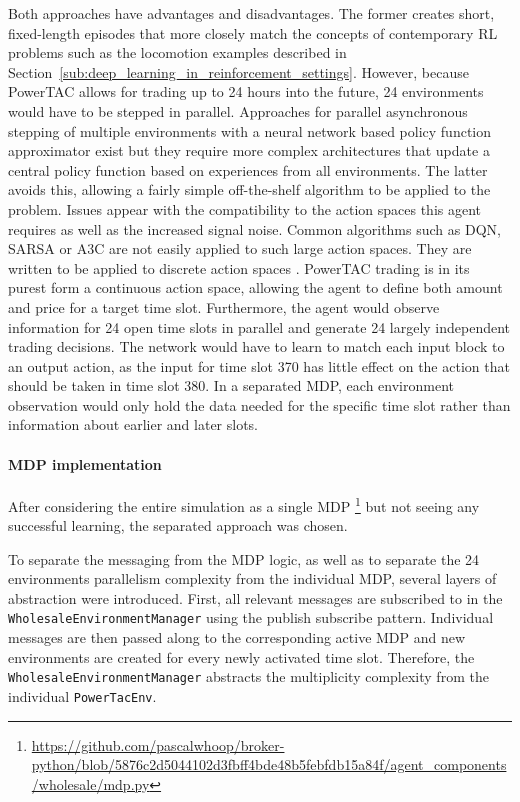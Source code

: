 Both approaches have advantages and disadvantages. The former creates short, fixed-length episodes that more closely
match the concepts of contemporary \ac{RL} problems such as the locomotion examples described in
Section~\ref{sub:deep_learning_in_reinforcement_settings}. However, because \ac{PowerTAC} allows for trading up to 24 hours into the future, 24
environments would have to be stepped in parallel. Approaches for parallel asynchronous stepping of multiple
environments with a neural network based policy function approximator exist \citep{mnih2016asynchronous,hafner2017agents}
but they require more complex architectures that update a central policy function based on experiences from all environments.
The latter avoids this, allowing a fairly simple off-the-shelf algorithm to be applied to the problem. Issues appear
with the compatibility to the action spaces this agent requires as well as the increased signal noise. Common algorithms
such as \ac{DQN}, \ac{SARSA} or \ac{A3C} are not easily applied to such large action spaces. They are written to be
applied to discrete action spaces \cite[]{baselines}. \ac{PowerTAC} trading is in its purest form a continuous action
space, allowing the agent to define both amount and price for a target time slot. Furthermore, the agent would observe
information for 24 open time slots in parallel and generate 24 largely independent trading decisions. The network would
have to learn to match each input block to an output action, as the input for time slot 370 has little effect on the
action that should be taken in time slot 380. In a separated \ac{MDP}, each environment observation would only hold the
data needed for the specific time slot rather than information about earlier and later slots.

\paragraph{\ac{MDP} implementation}%
\label{sub:mdp_design_and_implementation}

After considering the entire simulation as a single \ac{MDP}
\footnote{\url{https://github.com/pascalwhoop/broker-python/blob/5876c2d5044102d3fbff4bde48b5febfdb15a84f/agent_components/wholesale/mdp.py}}
but not seeing any successful learning, the separated approach was chosen.

To separate the messaging from the \ac{MDP} logic, as well as to separate the 24 environments parallelism complexity
from the individual \ac{MDP}, several layers of abstraction were introduced. First, all relevant messages are
subscribed to in the \texttt{WholesaleEnvironmentManager} using the publish subscribe pattern. Individual messages are
then passed along to the corresponding active \ac{MDP} and new environments are created for every newly activated
time slot. Therefore, the \texttt{WholesaleEnvironmentManager} abstracts the multiplicity complexity from the individual
\texttt{PowerTacEnv}.

